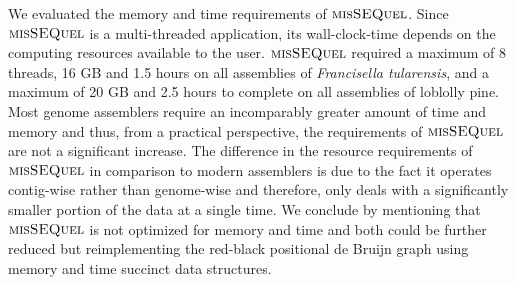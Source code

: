 We evaluated the memory and time requirements of $\mbox{\rm {\sc misSEQuel}}$.   Since $\mbox{\rm {\sc misSEQuel}}$ is a multi-threaded application, its wall-clock-time depends on the computing resources available to the user.  
$\mbox{\rm {\sc misSEQuel}}$ required a maximum of 8 threads, 16 GB and 1.5 hours on all assemblies of {\em  Francisella tularensis}, and a maximum of 20 GB and 2.5 hours to complete on all assemblies of loblolly pine.
Most genome assemblers require an incomparably greater amount of time and memory and thus, from a practical perspective, the requirements of $\mbox{\rm {\sc misSEQuel}}$ are not a significant increase.  
The difference in the resource requirements of $\mbox{\rm {\sc misSEQuel}}$ in comparison to modern assemblers is due to the fact it operates contig-wise rather than genome-wise and therefore, only deals with a significantly smaller portion of the data at a single time.
We conclude by mentioning that $\mbox{\rm {\sc misSEQuel}}$ is not optimized for memory and time and both could be further reduced but reimplementing the red-black positional de Bruijn graph using memory and time succinct data structures. 

